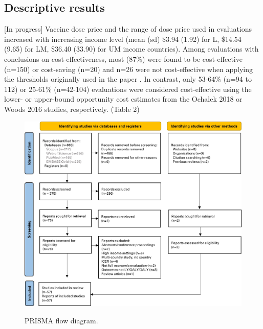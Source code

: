 \documentclass[12pt]{article}
\begin{document}
\subsection*{Descriptive results}
[In progress]
Vaccine dose price and the range of dose price used in evaluations increased with increasing income level (mean (sd) \$3.94 (1.92) for L, \$14.54 (9.65) for LM, \$36.40 (33.90)  for UM income countries). 
Among evaluations with conclusions on cost-effectiveness, most (87\%) were found to be cost-effective (n=150) or cost-saving (n=20) and n=26 were not cost-effective when applying the thresholds originally used in the paper . In contrast, only 53-64\% (n=94 to 112) or 25-61\% (n=42-104) evaluations were considered cost-effective using the lower- or upper-bound opportunity cost estimates from the Ochalek 2018 or Woods 2016 studies, respectively. (Table 2)


\begin{figure}[H]
    \centering
    \includegraphics[width=1\linewidth]{output/figures/prisma-flow-diagram.jpg}
    \caption{PRISMA flow diagram.}
    \label{fig:prisma-flow-diagram}
    \caption*{\footnotesize \textit{}}
\end{figure}
\end{document}
